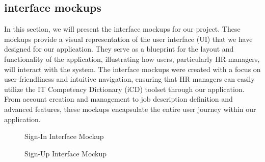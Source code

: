 \newpage
\subsection{interface mockups}
In this section, we will present the interface mockups for our project. These mockups provide a visual representation of the user interface (UI) that we have designed for our application. They serve as a blueprint for the layout and functionality of the application, illustrating how users, particularly HR managers, will interact with the system. The interface mockups were created with a focus on user-friendliness and intuitive navigation, ensuring that HR managers can easily utilize the IT Competency Dictionary (iCD) toolset through our application. From account creation and management to job description definition and advanced features, these mockups encapsulate the entire user journey within our application.

\begin{figure}[H]
    \centering
    \caption{ Sign-In Interface Mockup }
    \label{fig:Sign-In-Interface-Mockup}
\end{figure}

\begin{figure}[H]
    \centering
    \caption{ Sign-Up Interface Mockup }
    \label{fig:Sign-Up-Interface-Mockup}
\end{figure}

